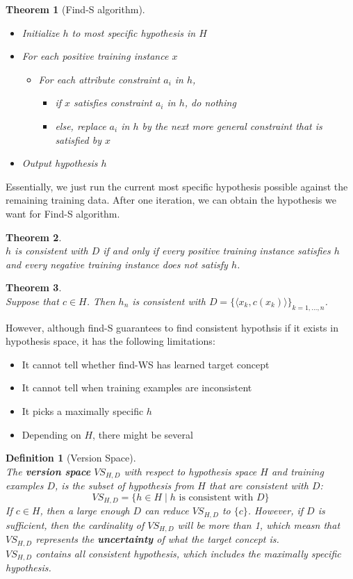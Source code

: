 \documentclass[12pt]{article}
\newtheorem{definition}{Definition}[section]
\newtheorem{theorem}{Theorem}[section]
\theoremstyle{definition}
\begin{document}
\begin{theorem}[Find-S algorithm]
\hfill\\\normalfont
\begin{itemize}
	\item Initialize $h$ to most specific hypothesis in $H$
	\item For each positive training instance $x$
	\begin{itemize}
		\item For each attribute constraint $a_i$ in $h$,
			\begin{itemize}
				\item if $x$ satisfies constraint $a_i$ in $h$, do nothing
				\item else, replace $a_i$ in $h$ by the next more general constraint that is satisfied by $x$
			\end{itemize}
	\end{itemize}
	\item Output hypothesis $h$
\end{itemize}
\end{theorem}
Essentially, we just run the current most specific hypothesis possible against the remaining training data. After one iteration, we can obtain the hypothesis we want for Find-S algorithm.
\begin{theorem}
\hfill\\\normalfont $h$ is consistent with $D$ if and only if every positive training instance satisfies $h$ and every negative training instance does not satisfy $h$.
\end{theorem}
\begin{theorem}
\hfill\\\normalfont Suppose that $c\in H$. Then $h_n$ is consistent with $D=\{\langle x_k, c(x_k)\rangle\}_{k=1,\ldots, n}$.
\end{theorem}
However, although find-S guarantees to find consistent hypothsis if it exists in hypothesis space, it has the following limitations:
\begin{itemize}
	\item It cannot tell whether find-WS has learned target concept
	\item It cannot tell when training examples are inconsistent
	\item It picks a maximally specific $h$
	\item Depending on $H$, there might be several
\end{itemize}
\begin{definition}[Version Space]
\hfill\\\normalfont The \textbf{version space} $VS_{H,D}$ with respect to hypothesis space $H$ and training examples $D$, is the subset of hypothesis from $H$ that are consistent with $D$:
\[
VS_{H,D}=\{h\in H \mid h \text{ is consistent with } D\}
\]
If $c\in H$, then a large enough $D$ can reduce $VS_{H,D}$ to $\{c\}$. However, if $D$ is sufficient, then the cardinality of $VS_{H,D}$ will be more than 1, which measn that $VS_{H,D}$ represents the \textbf{uncertainty} of what the target concept is.\\
$VS_{H,D}$ contains all consistent hypothesis, which includes the maximally specific hypothesis.
\end{definition}
\end{document}
